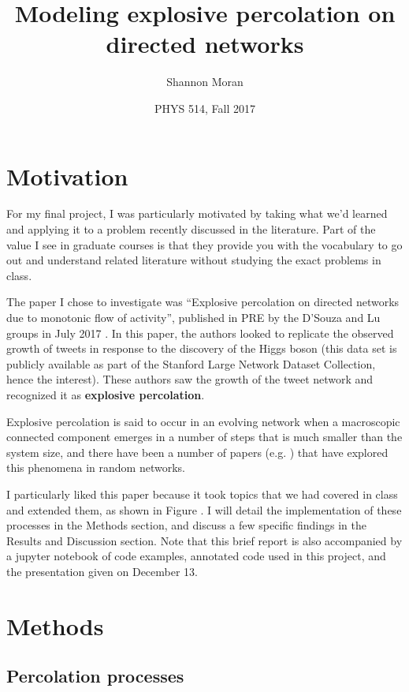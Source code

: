 \documentclass[11pt, oneside]{article}   	%
\title{Modeling explosive percolation on directed networks}
\author{Shannon Moran}
\date{PHYS 514, Fall 2017}							%
\begin{document}
\maketitle

\section{Motivation}

For my final project, I was particularly motivated by taking what we'd learned and applying it to a problem recently discussed in the literature. Part of the value I see in graduate courses is that they provide you with the vocabulary to go out and understand related literature without studying the exact problems in class.

The paper I chose to investigate was ``Explosive percolation on directed networks due to monotonic flow of activity'', published in PRE by the D'Souza and Lu groups in July 2017 \cite{Waagen_2017}. In this paper, the authors looked to replicate the observed growth of tweets in response to the discovery of the Higgs boson (this data set is publicly available as part of the Stanford Large Network Dataset Collection, hence the interest). These authors saw the growth of the tweet network and recognized it as \textbf{explosive percolation}.

Explosive percolation  is said to occur in an evolving network when a macroscopic connected component emerges in a number of steps that is much smaller than the system size, and there have  been a number of papers (e.g. \cite{Achlioptas_2009}) that have explored this phenomena in random networks.

I particularly liked this paper because it took topics that we had covered in class and extended them, as shown in Figure \label{fig:classwork}. I will detail the implementation of these processes in the Methods section, and discuss a few specific findings in the Results and Discussion section. Note that this brief report is also accompanied by a jupyter notebook of code examples, annotated code used in this project, and the presentation given on December 13.

\section{Methods}

\subsection{Percolation processes}
\end{document}
